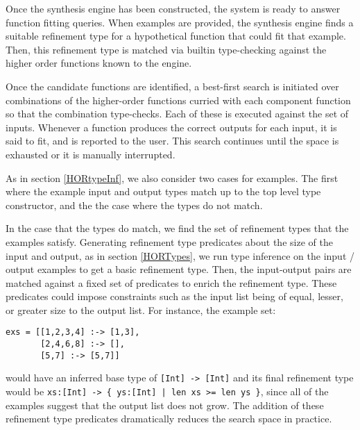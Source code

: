Once the synthesis engine has been constructed, the system is ready to answer function fitting queries. When examples are provided, the synthesis engine finds a suitable refinement type for a hypothetical function that could fit that example. Then, this refinement type is matched via builtin type-checking against the higher order functions known to the engine.

Once the candidate functions are identified, a best-first search is initiated over combinations of the higher-order functions curried with each component function so that the combination type-checks. Each of these is executed against the set of inputs. Whenever a function produces the correct outputs for each input, it is said to fit, and is reported to the user. This search continues until the space is exhausted or it is manually interrupted.

As in section \ref{HORtypeInf}, we also consider two cases for examples. The first where the example input and output types match up to the top level type constructor, and the the case where the types do not match.

In the case that the types do match, we find the set of refinement types that the examples satisfy. Generating refinement type predicates about the size of the input and output, as in section \ref{HORTypes}, we run type inference on the input / output examples to  get a basic refinement type. Then, the input-output pairs are matched against a fixed set of predicates to enrich the refinement type. These predicates could impose constraints such as the input list being of equal, lesser, or greater size to the output list.  For instance, the example set:

\begin{lstlisting}
exs = [[1,2,3,4] :-> [1,3],
       [2,4,6,8] :-> [],
       [5,7] :-> [5,7]]
\end{lstlisting}

\noindent would have an inferred base type  of \texttt{[Int] -> [Int]} and its final refinement type would be \texttt{xs:[Int] -> \{ ys:[Int] | len xs >= len ys \}}, since all of the examples suggest that the output list does not grow. The addition of these refinement type predicates dramatically reduces the search space in practice.

